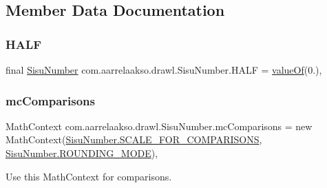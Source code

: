 \subsection{Member Data Documentation}
\mbox{\label{classcom_1_1aarrelaakso_1_1drawl_1_1_sisu_number_afae3e6d652b8c125dccab3e110d038b0}} 
\subsubsection{\texorpdfstring{H\+A\+LF}{HALF}}
{\footnotesize\ttfamily final \hyperlink{classcom_1_1aarrelaakso_1_1drawl_1_1_sisu_number}{Sisu\+Number} com.\+aarrelaakso.\+drawl.\+Sisu\+Number.\+H\+A\+LF = \hyperlink{classcom_1_1aarrelaakso_1_1drawl_1_1_sisu_number_abf3f63611bbeb0505b3d6217ba140f9b}{value\+Of}(0.)\hspace{0.3cm}{\ttfamily [static]}, {\ttfamily [protected]}}

\mbox{\label{classcom_1_1aarrelaakso_1_1drawl_1_1_sisu_number_a09a6e4440f1be870727ad0bc028fc237}} 
\subsubsection{\texorpdfstring{mc\+Comparisons}{mcComparisons}}
{\footnotesize\ttfamily Math\+Context com.\+aarrelaakso.\+drawl.\+Sisu\+Number.\+mc\+Comparisons = new Math\+Context(\hyperlink{classcom_1_1aarrelaakso_1_1drawl_1_1_sisu_number_a4630f8f5414673cb5021dc7d194dc257}{Sisu\+Number.\+S\+C\+A\+L\+E\+\_\+\+F\+O\+R\+\_\+\+C\+O\+M\+P\+A\+R\+I\+S\+O\+NS}, \hyperlink{classcom_1_1aarrelaakso_1_1drawl_1_1_sisu_number_a98077c422e928740febf571e3f2ec6b5}{Sisu\+Number.\+R\+O\+U\+N\+D\+I\+N\+G\+\_\+\+M\+O\+DE})\hspace{0.3cm}{\ttfamily [static]}, {\ttfamily [protected]}}



Use this Math\+Context for comparisons. 

